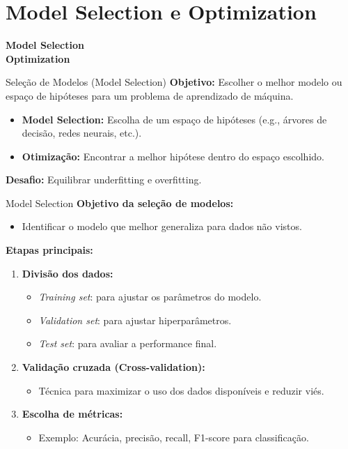 \documentclass{beamer}
\begin{document}
\section{Model Selection e Optimization}
\begin{frame}
\centering
\Huge
\textbf{Model Selection\\ Optimization}
\end{frame}

\begin{frame}{Seleção de Modelos (Model Selection)}
    \textbf{Objetivo:} Escolher o melhor modelo ou espaço de hipóteses para um problema de aprendizado de máquina.

    \begin{itemize}
        \item \textbf{Model Selection:} Escolha de um espaço de hipóteses (e.g., árvores de decisão, redes neurais, etc.).
        \item \textbf{Otimização:} Encontrar a melhor hipótese dentro do espaço escolhido.
    \end{itemize}

    \textbf{Desafio:} Equilibrar underfitting e overfitting.
\end{frame}

\begin{frame}{Model Selection}
    \textbf{Objetivo da seleção de modelos:}
    \begin{itemize}
        \item Identificar o modelo que melhor generaliza para dados não vistos.
    \end{itemize}

    \vspace{0.5cm}
    \textbf{Etapas principais:}
    \begin{enumerate}
        \item \textbf{Divisão dos dados:}
        \begin{itemize}
            \item \textit{Training set}: para ajustar os parâmetros do modelo.
            \item \textit{Validation set}: para ajustar hiperparâmetros.
            \item \textit{Test set}: para avaliar a performance final.
        \end{itemize}
        \item \textbf{Validação cruzada (Cross-validation):}
        \begin{itemize}
            \item Técnica para maximizar o uso dos dados disponíveis e reduzir viés.
        \end{itemize}
        \item \textbf{Escolha de métricas:}
        \begin{itemize}
            \item Exemplo: Acurácia, precisão, recall, F1-score para classificação.
        \end{itemize}
    \end{enumerate}
\end{frame}
\end{document}
